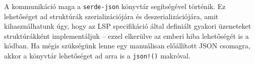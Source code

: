 A kommunikáció maga a \texttt{serde-json} könyvtár segítségével történik.
Ez lehetőséget ad struktúrák szerializációjára és deszerializációjára, amit kihasználhatunk úgy,
hogy az LSP specifikáció\cite{lsp-spec} által definiált gyakori üzeneteket struktúrákként implementáljuk --
ezzel elkerülve az emberi hiba lehetőségét is a kódban.
Ha mégis szükségünk lenne egy manuálisan előállított JSON csomagra, akkor a könyvtár lehetőséget ad 
arra is a \texttt{json!()} makróval.